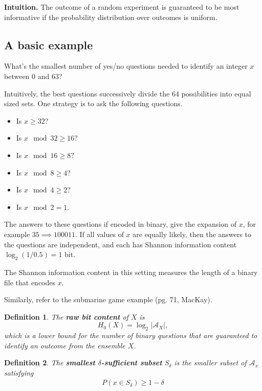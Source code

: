 \documentclass[12pt]{extarticle}
\newtheorem*{definition}{Definition}
\begin{document}
{\bf Intuition.} The outcome of a random experiment is guaranteed to be most informative if the probability distribution over outcomes is uniform.

\subsection{A basic example}

What's the smallest number of yes/no questions needed to identify an integer $x$ between 0 and 63?

Intuitively, the best questions successively divide the 64 possibilities into equal sized sets.  One strategy is to ask the following questions.

\begin{itemize}
  \item Is $x \geq 32$?
  \item Is $x \mod{32} \geq 16?$
  \item Is $x \mod{16} \geq 8?$
  \item Is $x \mod{8} \geq 4?$
  \item Is $x \mod{4} \geq 2$?
  \item Is $x \mod{2} = 1$.
\end{itemize}

The answers to these questions if encoded in binary, give the expansion of $x$, for example $35 \implies 100011$.  If all values of $x$ are equally likely, then the answers to the questions are independent, and each has Shannon information content $\log_2 (1 / 0.5) = 1$ bit.

The Shannon information content in this setting measures the length of a binary file that encodes $x$.

Similarly, refer to the submarine game example (pg. 71, MacKay).

\begin{definition}
  The {\bf raw bit content} of $X$ is 
  \[
    H_0(X) = \log_2 | \mathcal{A}_X |,
  \]
which is a lower bound for the number of binary questions that are guaranteed to identify an outcome from the ensemble $X$.
\end{definition}

\def\AA{\mathcal{A}}
\begin{definition}
  The {\bf smallest $\delta$-sufficient subset} $S_{\delta}$ is the smaller subset of $\AA_x$ satisfying
  \begin{align*}
    P(x \in S_{\delta}) \geq 1 - \delta
  \end{align*}
\end{definition}
\end{document}
